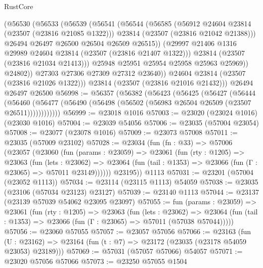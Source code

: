 \begin{lexlean}{RustCore}
\begin{coremodule}
                (@56530
                  (@56533
                    (@56539
                      (@56541
                        (@56544
                          (@56585
                            (@56912 @24604 @23814 (@23507 (@23816 @21085 @1322)))
                            @23814
                            (@23507 (@23816 @21042 @21388)))
                          @26494
                          @26497
                          @26500
                          @26504
                          @26509
                          @26515))
                      (@29997 @21406 @1316 @29989 @24604 @23814 (@23507 (@23816 @21407 @1322)))
                      @23814
                      (@23507 (@23816 @21034 @21413)))
                    @25948
                    @25951
                    @25954
                    @25958
                    @25963
                    @25969))
                @24802))
            @27303
            @27306
            @27309
            @27312
            @23640))
        @24604
        @23814
        (@23507 (@23816 @21026 @1322)))
      @23814
      (@23507 (@23816 @21016 @21432)))
    @26494
    @26497
    @26500
@56998 := @56357
    (@56382
      (@56423
        (@56425
          (@56427
            (@56444
              (@56460
                (@56477 (@56490 (@56498 (@56502 (@56983 @26504 @26509 (@23507 @26511))))))))))))
@56999 := @23018 @1016
@57003 := @23020 (@23024 @1016) (@23030 @1016)
@57004 := @23039 @54056
@57006 := @23035 (@57004 @23054)
@57008 := @23077 (@23078 @1016)
@57009 := @23073 @57008
@57011 := @23035 (@57009 @23102)
@57028 := @23034
    (fun (fn : @33) =>
    @57006
      (@23057
        (@23060
          (fun (params : @23059) =>
          @23061
            (fun (rty : @1205) =>
            @23063
              (fun (lets : @23062) =>
              @23064 (fun (tail : @1353) => @23066 (fun (Γ : @23065) => @57011 @23149))))))
        @23195))
    @1113
@57031 := @23201 (@57004 (@23052 @1113))
@57034 := @23114 (@23115 @1113) @54059
@57038 := @23035 (@23106 (@57034 @23123) @23127)
@57039 := @23140 @1113
@57044 := @23137 (@23139 @57039 @54062 @23095 @23097)
@57055 := fun (params : @23059) =>
  @23061
    (fun (rty : @1205) =>
    @23063
      (fun (lets : @23062) =>
      @23064 (fun (tail : @1353) => @23066 (fun (Γ : @23065) => @57011 (@57038 @57044)))))
@57056 := @23060 @57055
@57057 := @23057 @57056
@57066 := @23163
    (fun (U : @23162) => @23164 (fun (t : @7) => @23172 (@23035 (@23178 @54059 @23053) @23189)))
@57069 := @57031 (@57057 @57066) @54057
@57071 := @23020 @57056 @57066
@57073 := @23250 @57055 @1504

\end{coremodule}
\end{lexlean}
